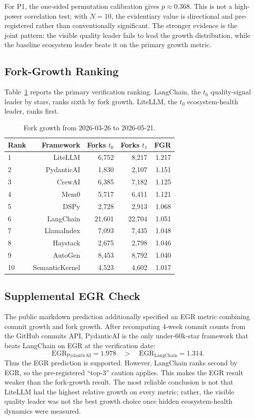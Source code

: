 \documentclass[12pt]{article}
\begin{document}
For P1, the one-sided permutation calibration gives $p \approx 0.368$. This is not a high-power correlation test; with $N=10$, the evidentiary value is directional and pre-registered rather than conventionally significant. The stronger evidence is the joint pattern: the visible quality leader fails to lead the growth distribution, while the baseline ecosystem leader beats it on the primary growth metric.

\subsection{Fork-Growth Ranking}

Table~\ref{tab:fgr-ranking} reports the primary verification ranking. LangChain, the $t_0$ quality-signal leader by stars, ranks sixth by fork growth. LiteLLM, the $t_0$ ecosystem-health leader, ranks first.

\begin{table}[h]
\centering
\caption{Fork growth from 2026-03-26 to 2026-05-21.}
\label{tab:fgr-ranking}
\begin{tabular}{lrrrr}
\toprule
Rank & Framework & Forks $t_0$ & Forks $t_1$ & FGR \\
\midrule
1 & LiteLLM        &  6,752 &  8,217 & 1.217 \\
2 & PydanticAI     &  1,830 &  2,107 & 1.151 \\
3 & CrewAI         &  6,385 &  7,182 & 1.125 \\
4 & Mem0           &  5,717 &  6,411 & 1.121 \\
5 & DSPy           &  2,728 &  2,913 & 1.068 \\
6 & LangChain      & 21,601 & 22,704 & 1.051 \\
7 & LlamaIndex     &  7,093 &  7,435 & 1.048 \\
8 & Haystack       &  2,675 &  2,798 & 1.046 \\
9 & AutoGen        &  8,453 &  8,792 & 1.040 \\
10 & SemanticKernel &  4,523 &  4,602 & 1.017 \\
\bottomrule
\end{tabular}
\end{table}

\subsection{Supplemental EGR Check}

The public markdown prediction additionally specified an EGR metric combining commit growth and fork growth. After recomputing 4-week commit counts from the GitHub commits API, PydanticAI is the only under-60k-star framework that beats LangChain on EGR at the verification date:
\[
\text{EGR}_{\text{PydanticAI}} = 1.978
\quad > \quad
\text{EGR}_{\text{LangChain}} = 1.314.
\]
Thus the EGR prediction is supported. However, LangChain ranks second by EGR, so the pre-registered ``top-3'' caution applies. This makes the EGR result weaker than the fork-growth result. The most reliable conclusion is not that LiteLLM had the highest relative growth on every metric; rather, the visible quality leader was not the best growth choice once hidden ecosystem-health dynamics were measured.
\end{document}
